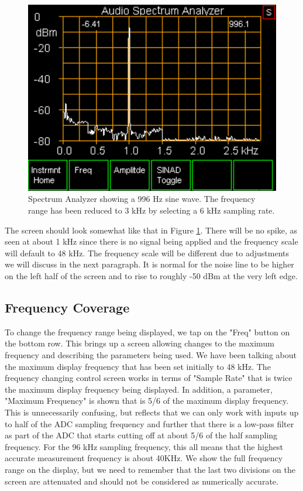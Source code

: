 \begin{figure}[H]
\begin{center}
\includegraphics[scale=0.75]{./images/AVNA_019.pdf}
\caption{Spectrum Analyzer  showing a 996 Hz sine wave.  The frequency range has been reduced to 3 kHz by selecting a 6 kHz sampling rate. }
\label{AVNA_019-label}
\end{center}
\end{figure}
%
The screen should look somewhat like that in Figure \ref{AVNA_019-label}.  There will be no spike, as seen at about 1 kHz since there is no signal being applied and the frequency scale will default to 48 kHz.  The frequency scale will be different due to adjustments we will discuss in the next paragraph.  It is normal for the noise line to be higher on the left half of the screen and to rise to roughly -50 dBm at the very left edge.

\subsection{Frequency Coverage} To change the frequency range being displayed, we tap on the "\textsf{Freq}" button on the bottom row.  This brings up a screen allowing changes to the maximum frequency and describing the parameters  being used.  We have been talking about the maximum display frequency that has been set initially to 48 kHz.  The frequency changing control screen works in terms of "Sample Rate" that is twice the maximum display frequency being displayed.  In addition, a parameter, "\textsf{Maximum Frequency}" is shown that is 5/6 of the maximum display frequency.  This is unnecessarily confusing, but reflects that we can only work with inputs up to half of the ADC sampling frequency and further that there is a low-pass filter as part of the ADC that starts cutting off at about 5/6 of the half sampling frequency.  For the 96 kHz sampling frequency, this all means that the highest accurate measurement frequency is about 40KHz.  We show the full frequency range on the display, but we need to remember that the last two divisions on the screen are attenuated and should not be considered as numerically accurate.

